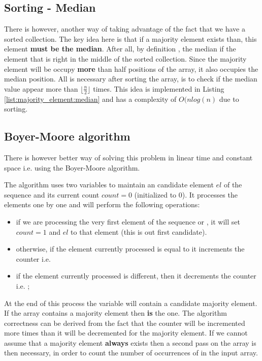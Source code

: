 \subsection{Sorting - Median}
\label{majority_element:sec:median}
There is however, another way of taking advantage of the fact that we have a sorted collection. The key idea here is that if a majority element exists than, this element \textbf{must be the median}. After all, by definition , the median if the element that is right in the middle of the sorted collection. Since the majority element will be occupy \textbf{more} than half positions of the array, it also occupies the median position.
All is necessary after sorting the array, is to check if the median value appear more than $\lfloor \frac{n}{2} \rfloor$ times. 
This idea is implemented in Listing \ref{list:majority_element:median} and has a complexity of $O(nlog(n)$ due to sorting.



\subsection{Boyer-Moore algorithm}
\label{majority_element:sec:linear}
There is however better way of solving this problem in linear time and constant space i.e. using the Boyer-Moore algorithm\cite{Boyer1991}.

The algorithm uses two variables to maintain an candidate element $el$ of the sequence and its current count $count=0$ (initialized to $0$). It processes the elements one by one and will perform the following operations:
\begin{itemize}
	\item if we are processing the very first element  of the sequence or , it will set $count=1$ and $el$ to that element (this is out first candidate).
	\item otherwise, if the element currently processed is equal to it increments the counter i.e. 
	\item if the element currently processed is different, then it decrements the counter i.e. ;
\end{itemize}


At the end of this process the variable  will contain a candidate majority element. If the array contains a majority element then  \textbf{is} the one. The algorithm correctness can be derived from the fact that the counter will be incremented more times than it will be decremented for the majority element. If we cannot assume that a majority element \textbf{always} exists then a second pass  on the array is then necessary, in order to count the number of occurrences of  in the input array.

